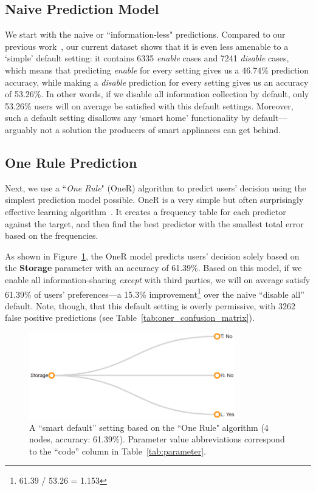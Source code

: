 \subsection{Naive Prediction Model}
We start with the naive or ``information-less" predictions. Compared to our previous work~\cite{bahiratiui2018}, our current dataset shows that it is even less amenable to a `simple' default setting: it contains 6335 \emph{enable} cases and 7241 \emph{disable} cases, which means that predicting \textit{enable} for every setting gives us a 46.74\% prediction accuracy, while making a \textit{disable} prediction for every setting gives us an accuracy of 53.26\%. In other words, if we disable all information collection by default, only 53.26\% users will on average be satisfied with this default settings. Moreover, such a default setting disallows any `smart home' functionality by default---arguably not a solution the producers of smart appliances can get behind.

\subsection{One Rule Prediction}
Next, we use a ``\textit{One Rule}" (OneR) algorithm to predict users' decision using the simplest prediction model possible. OneR is a very simple but often surprisingly effective learning algorithm~\cite{Holte1993}. It creates a frequency table for each predictor against the target, and then find the best predictor with the smallest total error based on the frequencies.

As shown in Figure~\ref{fig:oneR}, the OneR model predicts users' decision solely based on the \textbf{Storage} parameter with an accuracy of 61.39\%.  Based on this model, if we enable all information-sharing \emph{except} with third parties, we will on average satisfy 61.39\% of users' preferences---a 15.3\% improvement\footnote{61.39 / 53.26 = 1.153} over the naive ``disable all'' default. Note, though, that this default setting is overly permissive, with 3262 false positive predictions (see Table~\ref{tab:oner_confusion_matrix}).

\begin{figure}
	\centering
	\includegraphics[width=0.8\textwidth]{figures/oneR.png}
	\caption{A ``smart default'' setting based on the ``One Rule" algorithm (4 nodes, accuracy: 61.39\%). Parameter value abbreviations correspond to the ``code'' column in Table~\ref{tab:parameter}.}
	\label{fig:oneR}
\end{figure}



